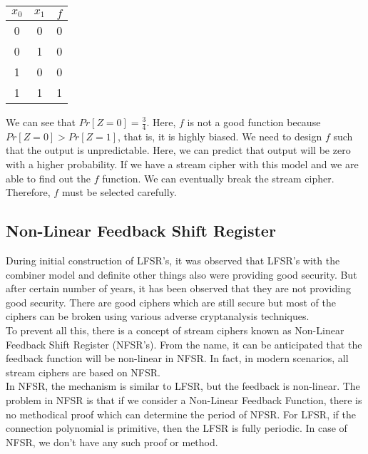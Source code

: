 \documentclass[11pt]{article}
\begin{document}
\begin{table}[h]
\centering
  \begin{tabular}{c|c||c}
        \textbf{$x_0$} & \textbf{$x_1$} & \textbf{$f$} \\
        \hline
        0 & 0 & 0 \\
        0 & 1 & 0 \\
        1 & 0 & 0 \\
        1 & 1 & 1 \\
  \end{tabular}
\end{table}
We can see that $Pr[Z = 0] = \frac{3}{4}$. Here, $f$ is not a good function because $Pr[Z = 0] > Pr[Z = 1]$, that is, it is highly biased. We need to design $f$ such that the output is unpredictable. Here, we can predict that output will be zero with a higher probability. If we have a stream cipher with this model and we are able to find out the $f$ function. We can eventually break the stream cipher. Therefore, $f$ must be selected carefully.

\subsection{Non-Linear Feedback Shift Register}
During initial construction of LFSR's, it was observed that LFSR's with the combiner model and definite other things also were providing good security. But after certain number of years, it has been observed that they are not providing good security. There are good ciphers which are still secure but most of the ciphers can be broken using various adverse cryptanalysis techniques.\\
\newline
To prevent all this, there is a concept of stream ciphers known as Non-Linear Feedback Shift Register (NFSR's). From the name, it can be anticipated that the feedback function will be non-linear in NFSR. In fact, in modern scenarios, all stream ciphers are based on NFSR.\\
\newline
In NFSR, the mechanism is similar to LFSR, but the feedback is non-linear. The problem in NFSR is that if we consider a Non-Linear Feedback Function, there is no methodical proof which can determine the period of NFSR. For LFSR, if the connection polynomial is primitive, then the LFSR is fully periodic. In case of NFSR, we don't have any such proof or method.
\end{document}
